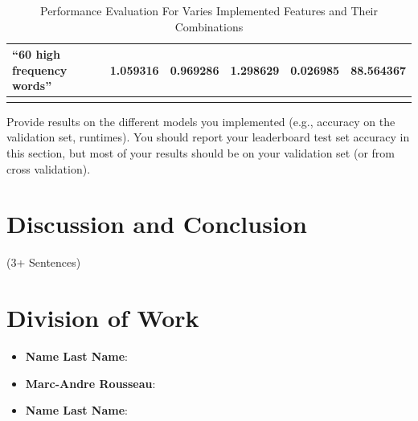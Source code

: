 \documentclass{amsart}
\theoremstyle{definition}
\theoremstyle{remark}
\numberwithin{equation}{section}
\begin{document}
\begin{table}[]
\begin{tabular}{|l|l|l|l|l|l|}
\textbf{“60 high frequency  words”}                                                                                                                                       & 1.059316                                                                    & 0.969286                                                                      & 1.298629                                                                   & 0.026985                                                            & 88.564367                                                                                                                                                     \\ \hline
                                                                                                                                                    \\ \hline
\end{tabular}
\caption{Performance Evaluation For Varies Implemented Features and Their Combinations}
\label{tbl:table_fp}
\end{table}


Provide results on the different models
you implemented (e.g., accuracy on the validation set, runtimes). You should report your leaderboard
test set accuracy in this section, but most of your results should be on your validation set (or from cross
validation).
\section{Discussion and Conclusion}(3+ Sentences)
\section{Division of Work}
\begin{itemize}
\item{\textbf{Name Last Name}}:
\item{\textbf{Marc-Andre Rousseau}}:
\item{\textbf{Name Last Name}}:
\end{itemize}



\def\IEEEbibitemsep{0pt plus .5pt}

%
%

\end{document}
